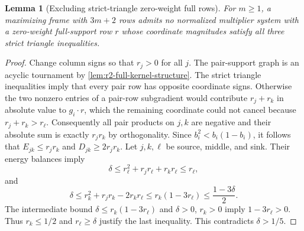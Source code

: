 \documentclass[11pt]{article}
\numberwithin{equation}{section}
\newtheorem{lemma}[lemma]{Lemma}
\theoremstyle{definition}
\theoremstyle{definition}
\begin{document}
\begin{lemma}[Excluding strict-triangle zero-weight full rows]
\label{lem:r2-strict-triangle}
For $m\ge1$, a maximizing frame with $3m+2$ rows admits no normalized
multiplier system with a zero-weight full-support row $r$ whose
coordinate magnitudes satisfy all three strict triangle inequalities.
\end{lemma}
\begin{proof}
Change column signs so that $r_j>0$ for all $j$.
The pair-support graph is an acyclic tournament by
\cref{lem:r2-full-kernel-structure}. The strict triangle
inequalities imply that every pair row has opposite coordinate signs.  Otherwise the two nonzero entries
of a pair-row subgradient would contribute $r_j+r_k$ in absolute
value to $g_i\cdot r$, which the remaining coordinate could not cancel
because $r_j+r_k>r_\ell$.  Consequently all pair products on
$j,k$ are negative and their absolute sum is exactly $r_jr_k$ by
orthogonality.  Since $b_i^2<b_i(1-b_i)$, it follows that
$E_{jk}\le r_jr_k$ and $D_{jk}\ge2r_jr_k$.
Let $j,k,\ell$ be source, middle, and sink. Their energy
balances imply
\[
 \delta\le r_\ell^2+r_jr_\ell+r_kr_\ell\le r_\ell,
\]
and
\[
 \delta\le r_k^2+r_jr_k-2r_kr_\ell
 \le r_k(1-3r_\ell)
 \le\frac{1-3\delta}{2}.
\]
The intermediate bound $\delta\le r_k(1-3r_\ell)$ and
$\delta>0$, $r_k>0$ imply $1-3r_\ell>0$.
Thus $r_k\le1/2$ and $r_\ell\ge\delta$ justify
the last inequality. This contradicts $\delta>1/5$.
\end{proof}
\end{document}
